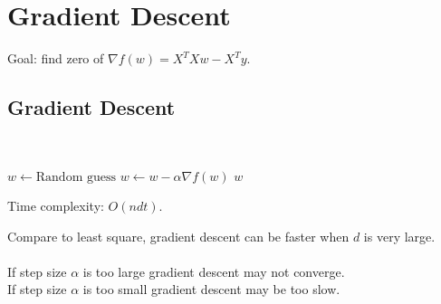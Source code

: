 \setcounter{chapter}{2}
\chapter{Gradient Descent}

Goal: find zero of $\nabla f(w) = X^{T}X w - X^{T}y$.

\setcounter{section}{0}

\section{Gradient Descent} \label{sec:}

\begin{alg}  ~
    \begin{algorithmic}
        \State $w \gets \text{Random guess}$
        \State $w \gets w - \alpha \nabla f(w)$
        \EndWhile
        \Return $w$
    \end{algorithmic}
\end{alg}

\begin{remark}
Time complexity: $O(ndt)$.
\end{remark}
Compare to least square, gradient descent can be faster when $d$ is very large.
\\
\\If step size $\alpha$ is too large gradient descent may not converge.
\\If step size $\alpha$ is too small gradient descent may be too slow.

